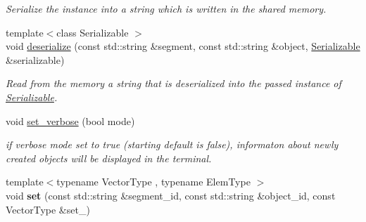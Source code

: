 \begin{DoxyCompactItemize}
\begin{DoxyCompactList}\small\item\em Serialize the instance into a string which is written in the shared memory. \end{DoxyCompactList}\item 
{\footnotesize template$<$class Serializable $>$ }\\void \hyperlink{namespaceshared__memory_a33e39adccccefb603e2dafc7ea8733e8}{deserialize} (const std\+::string \&segment, const std\+::string \&object, \hyperlink{classSerializable}{Serializable} \&serializable)
\begin{DoxyCompactList}\small\item\em Read from the memory a string that is deserialized into the passed instance of \hyperlink{classSerializable}{Serializable}. \end{DoxyCompactList}\item 
void \hyperlink{namespaceshared__memory_afe26d531f043f59bb36ea7816b8a40bf}{set\+\_\+verbose} (bool mode)
\begin{DoxyCompactList}\small\item\em if verbose mode set to true (starting default is false), informaton about newly created objects will be displayed in the terminal. \end{DoxyCompactList}\item 
{\footnotesize template$<$typename Vector\+Type , typename Elem\+Type $>$ }\\void {\bfseries set} (const std\+::string \&segment\+\_\+id, const std\+::string \&object\+\_\+id, const Vector\+Type \&set\+\_\+)\hypertarget{namespaceshared__memory_a653947408c221da4e2c26439ba913f8d}{}\label{namespaceshared__memory_a653947408c221da4e2c26439ba913f8d}

\end{DoxyCompactItemize}
